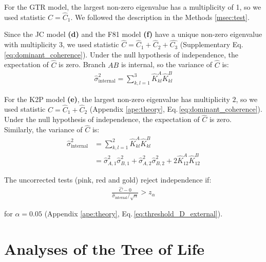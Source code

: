 \begin{appendices}
\medskip

For the GTR model, the largest non-zero eigenvalue has a multiplicity of
1, so we used statistic $\hat C = \hat{C}_1$. We followed the description in the Methods \ref{msec:test}.

Since the JC model \textbf{(d)} and the F81 model \textbf{(f)} have a unique non-zero eigenvalue with multiplicity $3$, we used statistic $\hat{C} = \hat{C}_1+\hat{C}_2+\hat{C_3}$ (Supplementary Eq.\,\eqref{eq:dominant_coherence}).  Under the null hypothesis of independence, the expectation of $\hat{C}$ is zero. Branch $AB$ is internal, so the variance of $\hat C$ is:
\begin{align*}
  \hat{\sigma}^2_{\text{internal}} =  \sum_{k, l=1}^3
   \hat{K}^A_{kl}   \hat{K}^B_{kl}
\end{align*}

 For the K2P model \textbf{(e)}, the largest non-zero eigenvalue  has multiplicity $2$, so we used statistic $\hat{C} = \hat{C}_1+\hat{C}_2$ (Appendix \ref{ape:theory}, Eq.\,\eqref{eq:dominant_coherence}). Under the null hypothesis of independence, the expectation of $\hat{C}$ is zero. Similarly, the variance of $\hat C$ is:
\begin{align*}
  \hat{\sigma}^2_{\text{internal}} &= \sum_{k, l=1}^2
   \hat{K}^A_{kl}   \hat{K}^B_{kl}\\
   &=\hat{\sigma}^2_{A,1}\hat{\sigma}^2_{B,1}+\hat{\sigma}^2_{A,2}\hat{\sigma}^2_{B,2} + 2\hat{K}^A_{12}\hat{K}^B_{12}
\end{align*}

The uncorrected tests ({\color{truetree}pink}, {\color{truetreeML}red} and {\color{truetreeNoMisspecification}gold}) reject independence if:
\begin{align*}
 \frac{\hat{C}-0}{\hat{\sigma}_{\text{internal}}/\sqrt{n}} > z_\alpha 
\end{align*}

for $\alpha=0.05$ (Appendix \ref{ape:theory}, Eq.\,\eqref{eq:threshold_D_external}).

\bigskip



    \clearpage

    
\newpage
\section{Analyses of the Tree of Life}


\end{appendices}
